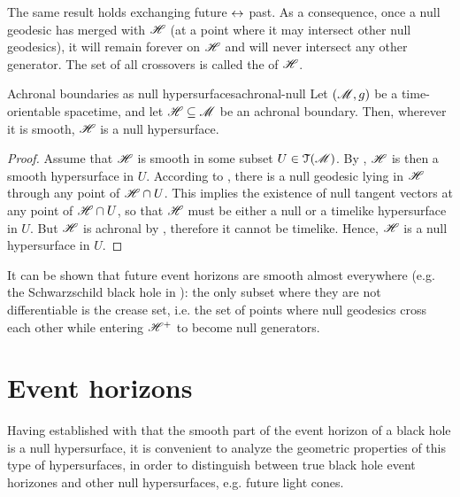 The same result holds exchanging future $ \leftrightarrow $ past.
As a consequence, once a null geodesic has merged with $ \mathscr{H} $ (at a point where it may intersect other null geodesics), it will remain forever on $ \mathscr{H} $ and will never intersect any other generator. The set of all crossovers is called the  of $ \mathscr{H} $.


\begin{proposition}{Achronal boundaries as null hypersurfaces}{achronal-null}
  Let $ (\mathscr{M} , g) $ be a time-orientable spacetime, and let $ \mathscr{H} \subseteq \mathscr{M} $ be an achronal boundary. Then, wherever it is smooth, $ \mathscr{H} $ is a null hypersurface.
\end{proposition}

\begin{proofbox}
  \begin{proof}
    Assume that $ \mathscr{H} $ is smooth in some subset $ U \in \EuScript{T}(\mathscr{M}) $. By , $ \mathscr{H} $ is then a smooth hypersurface in $ U $. According to , there is a null geodesic lying in $ \mathscr{H} $ through any point of $ \mathscr{H} \cap U $. This implies the existence of null tangent vectors at any point of $ \mathscr{H} \cap U $, so that $ \mathscr{H} $ must be either a null or a timelike hypersurface in $ U $. But $ \mathscr{H} $ is achronal by , therefore it cannot be timelike. Hence, $ \mathscr{H} $ is a null hypersurface in $ U $.
  \end{proof}
\end{proofbox}

It can be shown that future event horizons are smooth almost everywhere (e.g. the Schwarzschild black hole in ): the only subset where they are not differentiable is the crease set, i.e. the set of points where null geodesics cross each other while entering $ \mathscr{H}^+ $ to become null generators.

\section{Event horizons}
\label{sec:event-horizons}

Having established with  that the smooth part of the event horizon of a black hole is a null hypersurface, it is convenient to analyze the geometric properties of this type of hypersurfaces, in order to distinguish between true black hole event horizones and other null hypersurfaces, e.g. future light cones.

